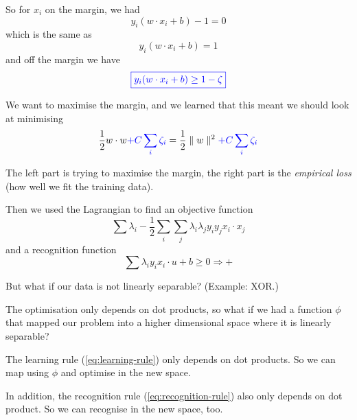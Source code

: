 So for $x_i$ on the margin, we had
\begin{displaymath}
  \boxed{y_i(w\cdot x_i + b) - 1 = 0}
\end{displaymath}
which is the same as
\begin{displaymath}
  \boxed{y_i(w\cdot x_i + b) = 1}
\end{displaymath}
and off the margin we have
\begin{displaymath}
  \textcolor{blue}{\boxed{y_i(w\cdot x_i + b) \ge 1-\zeta}}
\end{displaymath}

We want to maximise the margin, and we learned that this meant we
should look at minimising
\begin{displaymath}
  \frac 12 w\cdot w \textcolor{blue}{+ C\sum_i \zeta_i}
  = \frac 12 \parallel w \parallel^2 \textcolor{blue}{+ C\sum_i \zeta_i}
\end{displaymath}

The left part is trying to maximise the margin, the right part is the
\textit{empirical loss} (how well we fit the training data).


Then we used the Lagrangian to find an objective function
\begin{displaymath}
  \sum\lambda_i - \frac 12 \sum_i \sum_j \lambda_i \lambda_j y_i y_j
  x_i\cdot x_j
\end{displaymath}
and a recognition function
\begin{displaymath}
    \sum \lambda_i y_i x_i\cdot u + b \ge 0 \Rightarrow +
\end{displaymath}



But what if our data is not linearly separable?  (Example: XOR.)

The optimisation only depends on dot products, so what if we had a
function $\phi$ that mapped our problem into a higher dimensional
space where it is linearly separable?

The learning rule (\ref{eq:learning-rule}) only depends on dot
products.  So we can map using $\phi$ and optimise in the new space.

In addition, the recognition rule (\ref{eq:recognition-rule}) also
only depends on dot product.  So we can recognise in the new space,
too.

